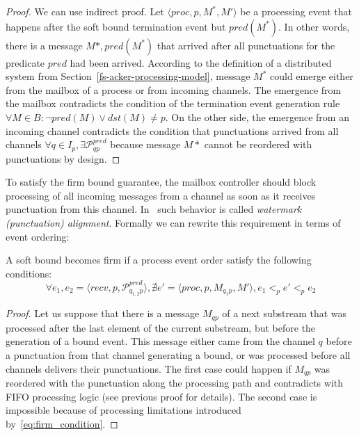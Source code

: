 \begin{proof}
We can use indirect proof. Let $\langle proc, p, M^*, M' \rangle$ be a processing event that happens after the soft bound termination event but $pred(M^*)$. In other words, there is a message $M*, pred(M^*)$ that arrived after all punctuations for the predicate $pred$ had been arrived. According to the definition of a distributed system from Section~\ref{fs-acker-processing-model}, message $M^*$ could emerge either from the mailbox of a process or from incoming channels. The emergence from the mailbox contradicts the condition of the termination event generation rule $\forall M\in B : \neg pred(M) \vee dst(M) \ne p$. On the other side, the emergence from an incoming channel contradicts the condition that punctuations arrived from all channels $\forall q \in I_p, \exists \mathcal{P}^{pred}_{qp}$ because message $M*$ cannot be reordered with punctuations by design.
\end{proof}

To satisfy the firm bound guarantee, the mailbox controller should block processing of all incoming messages from a channel as soon as it receives punctuation from this channel. In~\cite{Carbone:2017:SMA:3137765.3137777} such behavior is called {\em watermark (punctuation) alignment}. Formally we can rewrite this requirement in terms of event ordering:

\begin{lemma}
A soft bound becomes firm if a process event order satisfy the following conditions:
\begin{equation}
  \forall e_1, e_2 = \langle recv, p, \mathcal{P}^{pred}_{q_{1,2}p} \rangle, \nexists e' = \langle proc, p, M_{q_1p}, M' \rangle, e_1 <_p e' <_p e_2
  \label{eq:firm_condition}
\end{equation}
\end{lemma}
\begin{proof}
Let us suppose that there is a message $M_{qp}$ of a next substream that was processed after the last element of the current substream, but before the generation of a bound event. This message either came from the channel $q$ before a punctuation from that channel generating a bound, or was processed before all channels delivers their punctuations. The first case could happen if $M_{qp}$ was reordered with the punctuation along the processing path and contradicts with FIFO processing logic (see previous proof for details). The second case is impossible because of processing limitations introduced by~\ref{eq:firm_condition}.
\end{proof}
